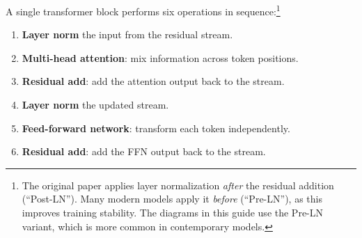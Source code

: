 A single transformer block performs six operations in sequence:\footnote{The original paper applies layer normalization \emph{after} the residual addition (``Post-LN''). Many modern models apply it \emph{before} (``Pre-LN''), as this improves training stability. The diagrams in this guide use the Pre-LN variant, which is more common in contemporary models.}
\begin{enumerate}
    \item \textbf{Layer norm} the input from the residual stream.
    \item \textbf{Multi-head attention}: mix information across token positions.
    \item \textbf{Residual add}: add the attention output back to the stream.
    \item \textbf{Layer norm} the updated stream.
    \item \textbf{Feed-forward network}: transform each token independently.
    \item \textbf{Residual add}: add the FFN output back to the stream.
\end{enumerate}

